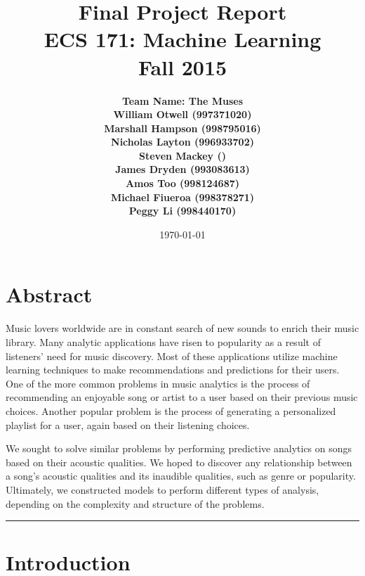 \documentclass[12pt]{article}
\title{\vspace{-3ex}\bf Final Project Report\\[2ex] 
       \normalsize ECS 171: Machine Learning\\Fall 2015}
\date{\today}
\author{\bf Team Name: The Muses\\ \bf William Otwell (997371020)\\ \bf Marshall Hampson (998795016)\\ \bf Nicholas Layton (996933702)\\ \bf Steven Mackey ()\\ \bf James Dryden (993083613)\\ \bf Amos Too (998124687)\\ \bf Michael Fiueroa (998378271)\\ \bf Peggy Li (998440170)}
\newcommand{\horizontalLine}{
	\begin{center}
		\hrule width 1.0\textwidth
	\end{center}
}
\begin{document}
\maketitle
\pagebreak
\tableofcontents
\pagebreak
\section{Abstract}
\label{sec:abstract}
Music lovers worldwide are in constant search of new sounds to enrich their music library. Many analytic applications have risen to popularity as a result of listeners' need for music discovery. Most of these applications utilize machine learning techniques to make recommendations and predictions for their users. One of the more common problems in music analytics is the process of recommending an enjoyable song or artist to a user based on their previous music choices. Another popular problem is the process of generating a personalized playlist for a user, again based on their listening choices. 

We sought to solve similar problems by performing predictive analytics on songs based on their acoustic qualities. We hoped to discover any relationship between a song's acoustic qualities and its inaudible qualities, such as genre or popularity. Ultimately, we constructed models to perform different types of analysis, depending on the complexity and structure of the problems. 
\horizontalLine
\section{Introduction}
\label{sec:introduction}
\end{document}
